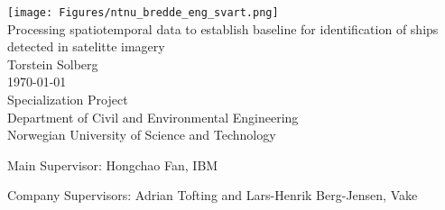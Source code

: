 \thispagestyle{empty}
\texttt{[image: Figures/ntnu\_bredde\_eng\_svart.png]}
\mbox{}\\[6pc]

\Huge{Processing spatiotemporal data to establish baseline for identification of ships detected in satelitte imagery }\\[2pc]

\Large{Torstein Solberg}\\[1pc]
\large{\monthyeardate\today}\\[2pc]

Specialization Project\\
Department of Civil and Environmental Engineering\\
Norwegian University of Science and Technology






\vfill

\noindent Main Supervisor: Hongchao Fan, IBM

\noindent Company Supervisors: Adrian Tofting and Lars-Henrik Berg-Jensen, Vake


